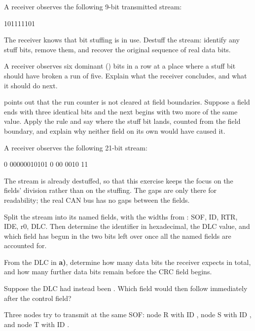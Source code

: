  A receiver observes the following 9-bit transmitted stream:

\begin{textdrawing}
101111101
\end{textdrawing}

The receiver knows that bit stuffing is in use. Destuff the stream: identify any stuff bits, remove
them, and recover the original sequence of real data bits.

 A receiver observes six dominant () bits in a row at a place where a stuff bit
should have broken a run of five. Explain what the receiver concludes, and what it should do next.

  points out that the run counter is not cleared at field
boundaries. Suppose a field ends with three identical bits and the next begins with two more of the
same value. Apply the rule and say where the stuff bit lands, counted from the field boundary, and
explain why neither field on its own would have caused it.

\label{c10:ex:decode}
A receiver observes the following 21-bit stream:

\begin{textdrawing}
0 00000010101 0 00 0010 11
\end{textdrawing}

The stream is already destuffed, so that this exercise keeps the focus on the fields' division rather
than on the stuffing. The gaps are only there for readability; the real CAN bus has no gaps between
the fields.

 Split the stream into its named fields, with the widths from :
SOF, ID, RTR, IDE, r0, DLC. Then determine the identifier in hexadecimal, the DLC value, and which
field has begun in the two bits left over once all the named fields are accounted for.

 From the DLC in \textbf{a)}, determine how many data bits the receiver expects in total,
and how many further data bits remain before the CRC field begins.

 Suppose the DLC had instead been . Which field would then follow immediately
after the control field?

\label{c10:ex:arb3}
Three nodes try to transmit at the same SOF: node R with ID , node S with ID
, and node T with ID .

